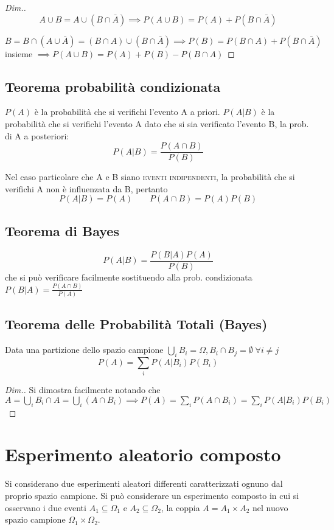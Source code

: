 \begin{proof}[Dim.] 
\[A\cup B=A\cup(B\cap\bar{A})\implies P(A\cup B)=P(A)+P(B\cap\bar{A})\]

\[B=B\cap(A\cup\bar{A})=(B\cap A)\cup(B\cap\bar{A})\implies P(B)=P(B\cap A)+P(B\cap\bar{A})\]
insieme $\implies P(A\cup B)=P(A)+P(B)-P(B\cap A)$
\end{proof}

\subsection{Teorema probabilità condizionata}
$P(A)$ è la probabilità che si verifichi l'evento A a priori.
$P(A|B)$ è la probabilità che si verifichi l'evento A dato che si sia verificato l'evento B, la prob. di A a posteriori:
\begin{equation}
P(A|B)=\frac{P(A\cap B)}{P(B)}
\end{equation}

Nel caso particolare che A e B siano \textsc{eventi indipendenti}, la probabilità che si verifichi A non è influenzata da B, pertanto \[P(A|B)=P(A)\qquad P(A\cap B)=P(A)P(B)\]

\subsection{Teorema di Bayes}
\begin{equation}
P(A|B)=\frac{P(B|A)P(A)}{P(B)}
\end{equation}
che si può verificare facilmente sostituendo alla prob. condizionata $P(B|A)=\frac{P(A\cap B)}{P(A)}$

\subsection{Teorema delle Probabilità Totali (Bayes)}
Data una partizione dello spazio campione $\bigcup_i B_i=\Omega, B_i\cap B_j=\emptyset \;\forall i\neq j$
\begin{equation}
P(A)=\sum_i P(A|B_i)P(B_i)
\end{equation}

\begin{proof}[Dim.]
Si dimostra facilmente notando che $A=\bigcup_i B_i \cap A=\bigcup_i (A\cap B_i) \implies P(A)=\sum_i P(A\cap B_i)=\sum_i P(A|B_i)P(B_i)$
\end{proof}

\section{Esperimento aleatorio composto}
Si considerano due esperimenti aleatori differenti caratterizzati ognuno dal proprio spazio campione. Si può considerare un esperimento composto in cui si osservano i due eventi $A_1\subseteq\Omega_1$ e $A_2\subseteq\Omega_2$, la coppia $A=A_1\times A_2$ nel nuovo spazio campione $\Omega_1\times\Omega_2$.

